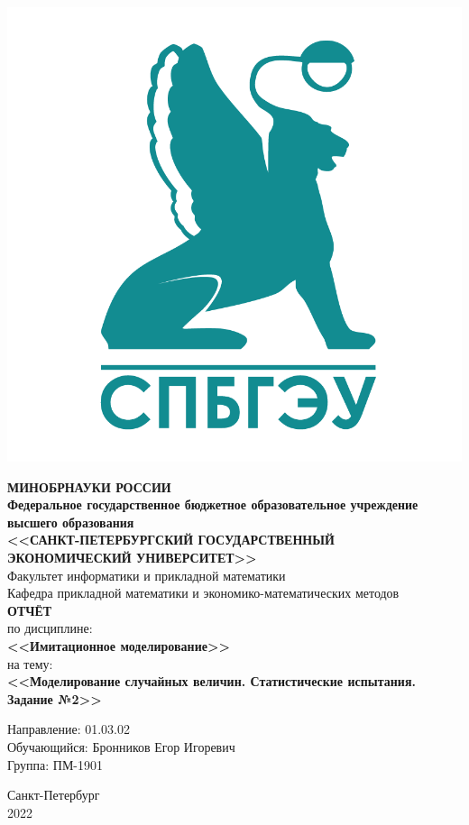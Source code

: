 \documentclass[14pt,fleqn]{extarticle}
\begin{document}
	\begin{titlepage}
		\includegraphics[scale=0.12]{logo}
		\begin{center}
			\textbf{МИНОБРНАУКИ РОССИИ}\\
			\vspace{0.2cm}
			\textbf{Федеральное государственное бюджетное образовательное учреждение высшего образования}\\
			\textbf{<<САНКТ-ПЕТЕРБУРГСКИЙ ГОСУДАРСТВЕННЫЙ ЭКОНОМИЧЕСКИЙ УНИВЕРСИТЕТ>>}\\
			\vspace{0.6cm}
			Факультет информатики и прикладной математики\\
			Кафедра прикладной математики и экономико-математических методов\\
			\vspace{1cm}
			\textbf{ОТЧЁТ}\\
			по дисциплине:\\
			\textbf{<<Имитационное моделирование>>}\\
			на тему:\\
			\textbf{<<Моделирование случайных величин. Статистические испытания. Задание №2>>}\\
		\end{center}
		\vspace{1cm}
		Направление: 01.03.02\\
		Обучающийся: Бронников Егор Игоревич\\
		Группа: ПМ-1901\\
		\vfill
		\begin{center}
			Санкт-Петербург\\
			2022\\
		\end{center}
	\end{titlepage}
\end{document}
